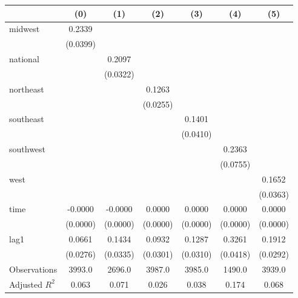 \begin{tabular}{lcccccc}
\toprule
 & (0) & (1) & (2) & (3) & (4) & (5) \\
\midrule
midwest & 0.2339 &  &  &  &  &  \\
\vspace{0.2cm}
 & (0.0399) &  &  &  &  &  \\
national &  & 0.2097 &  &  &  &  \\
\vspace{0.2cm}
 &  & (0.0322) &  &  &  &  \\
northeast &  &  & 0.1263 &  &  &  \\
\vspace{0.2cm}
 &  &  & (0.0255) &  &  &  \\
southeast &  &  &  & 0.1401 &  &  \\
\vspace{0.2cm}
 &  &  &  & (0.0410) &  &  \\
southwest &  &  &  &  & 0.2363 &  \\
\vspace{0.2cm}
 &  &  &  &  & (0.0755) &  \\
west &  &  &  &  &  & 0.1652 \\
\vspace{0.2cm}
 &  &  &  &  &  & (0.0363) \\
time & -0.0000 & -0.0000 & 0.0000 & 0.0000 & 0.0000 & 0.0000 \\
\vspace{0.2cm}
 & (0.0000) & (0.0000) & (0.0000) & (0.0000) & (0.0000) & (0.0000) \\
lag1 & 0.0661 & 0.1434 & 0.0932 & 0.1287 & 0.3261 & 0.1912 \\
\vspace{0.2cm}
 & (0.0276) & (0.0335) & (0.0301) & (0.0310) & (0.0418) & (0.0292) \\
\midrule
Observations & 3993.0 & 2696.0 & 3987.0 & 3985.0 & 1490.0 & 3939.0 \\
Adjusted $R^2$ & 0.063 & 0.071 & 0.026 & 0.038 & 0.174 & 0.068 \\
\bottomrule
\end{tabular}